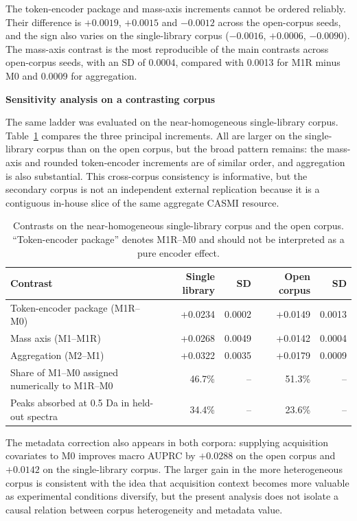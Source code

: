 \documentclass[11pt]{article}
\newcommand{\hd}[1]{\medskip\par\noindent\textbf{#1}\par\nobreak\vspace{2pt}\noindent\ignorespaces}
\begin{document}
The token-encoder package and mass-axis increments cannot be ordered reliably. Their difference is $+0.0019$, $+0.0015$ and $-0.0012$ across the open-corpus seeds, and the sign also varies on the single-library corpus ($-0.0016$, $+0.0006$, $-0.0090$). The mass-axis contrast is the most reproducible of the main contrasts across open-corpus seeds, with an SD of 0.0004, compared with 0.0013 for M1R minus M0 and 0.0009 for aggregation.

\hd{Sensitivity analysis on a contrasting corpus}
The same ladder was evaluated on the near-homogeneous single-library corpus. Table~\ref{tab:corpora} compares the three principal increments. All are larger on the single-library corpus than on the open corpus, but the broad pattern remains: the mass-axis and rounded token-encoder increments are of similar order, and aggregation is also substantial. This cross-corpus consistency is informative, but the secondary corpus is not an independent external replication because it is a contiguous in-house slice of the same aggregate CASMI resource.

\begin{table}[ht]
\centering
\caption{Contrasts on the near-homogeneous single-library corpus and the open corpus. ``Token-encoder package'' denotes M1R--M0 and should not be interpreted as a pure encoder effect.}
\label{tab:corpora}
\small
\begin{tabular}{lrrrr}
\toprule
Contrast & Single library & SD & Open corpus & SD\\
\midrule
Token-encoder package (M1R--M0) & +0.0234 & 0.0002 & +0.0149 & 0.0013\\
Mass axis (M1--M1R) & +0.0268 & 0.0049 & +0.0142 & 0.0004\\
Aggregation (M2--M1) & +0.0322 & 0.0035 & +0.0179 & 0.0009\\
Share of M1--M0 assigned numerically to M1R--M0 & 46.7\% & -- & 51.3\% & --\\
Peaks absorbed at 0.5 Da in held-out spectra & 34.4\% & -- & 23.6\% & --\\
\bottomrule
\end{tabular}
\end{table}

The metadata correction also appears in both corpora: supplying acquisition covariates to M0 improves macro AUPRC by $+0.0288$ on the open corpus and $+0.0142$ on the single-library corpus. The larger gain in the more heterogeneous corpus is consistent with the idea that acquisition context becomes more valuable as experimental conditions diversify, but the present analysis does not isolate a causal relation between corpus heterogeneity and metadata value.
\end{document}
